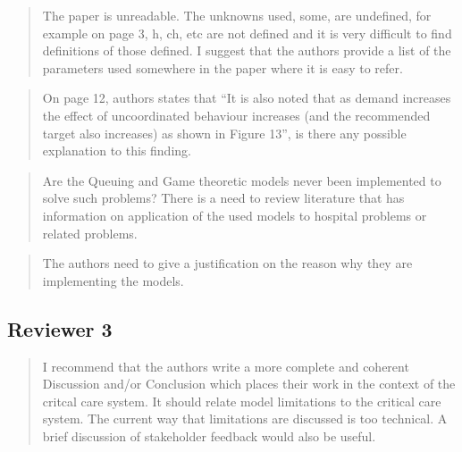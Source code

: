\documentclass{article}
\begin{document}
\begin{quote}
    \begin{textit}{
The paper is unreadable. The unknowns used, some, are undefined, for example on page 3, h, ch, etc are not defined and it is very difficult to find definitions of those defined. I suggest that the authors provide a list of the parameters used somewhere in the paper where it is easy to refer.
    }\end{textit}
\end{quote}


\begin{quote}
    \begin{textit}{
    On page 12, authors states that ``It is also noted that as demand increases the effect of uncoordinated behaviour increases (and the recommended target also increases) as shown in Figure 13'', is there any possible explanation to this finding.
    }\end{textit}
\end{quote}


\begin{quote}
    \begin{textit}{
    Are the Queuing and Game theoretic models never been implemented to solve such problems? There is a need to review literature that has information on application of the used models to hospital problems or related problems.
    }\end{textit}
\end{quote}


\begin{quote}
    \begin{textit}{
The authors need to give a justification on the reason why they are implementing the models.
    }\end{textit}
\end{quote}

\subsection{Reviewer 3}


\begin{quote}
    \begin{textit}
        {I recommend that the authors write a more complete and coherent
        Discussion and/or Conclusion which places their work in the context of
        the critcal care system.  It should relate model limitations to the
        critical care system. The current way that limitations are discussed
        is too technical. A brief discussion of stakeholder feedback would
        also be useful.}
    \end{textit}
\end{quote}
\end{document}
